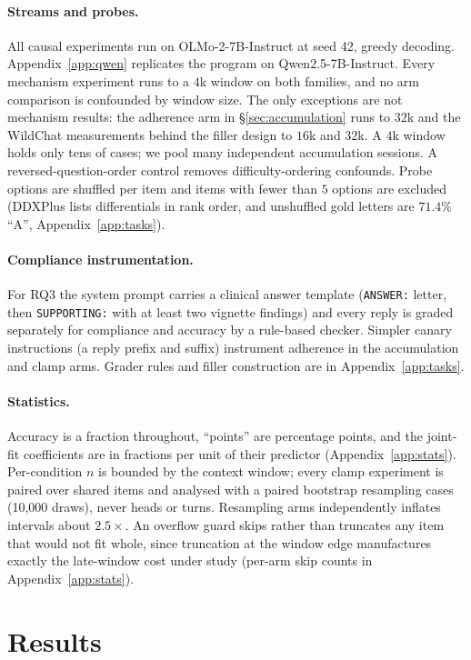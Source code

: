\documentclass{article}
\begin{document}
\paragraph{Streams and probes.}
All causal experiments run on OLMo-2-7B-Instruct at seed 42, greedy decoding.
Appendix~\ref{app:qwen} replicates the program on Qwen2.5-7B-Instruct. Every mechanism experiment runs to a $4$k window on both families, and no arm comparison is
confounded by window size. The only exceptions are not mechanism results: the adherence arm in
\S\ref{sec:accumulation} runs to $32$k and the WildChat measurements behind the filler design
to $16$k and $32$k. A $4$k window
holds only tens of cases; we pool many independent accumulation sessions. A
reversed-question-order control removes difficulty-ordering confounds. Probe options are shuffled
per item and items with fewer than $5$ options are excluded (DDXPlus lists differentials in rank
order, and unshuffled gold letters are $71.4\%$ ``A'', Appendix~\ref{app:tasks}).

\paragraph{Compliance instrumentation.}
For RQ3 the system prompt carries a clinical answer template (\texttt{ANSWER:} letter, then
\texttt{SUPPORTING:} with at least two vignette findings) and every reply is graded separately
for compliance and accuracy by a rule-based checker. Simpler canary instructions (a reply prefix
and suffix) instrument adherence in the accumulation and clamp arms. Grader rules and filler construction are in Appendix~\ref{app:tasks}.

\paragraph{Statistics.}
Accuracy is a fraction throughout, ``points'' are percentage points, and the joint-fit
coefficients are in fractions per unit of their predictor (Appendix~\ref{app:stats}). Per-condition $n$ is bounded by the context window; every clamp experiment is paired over
shared items and analysed with a paired bootstrap resampling cases (10{,}000 draws), never
heads or turns. Resampling arms independently inflates intervals about $2.5\times$. An overflow guard skips rather than truncates any item that would not fit whole, since
truncation at the window edge manufactures exactly the late-window cost under study (per-arm
skip counts in Appendix~\ref{app:stats}).

\section{Results}
\end{document}
